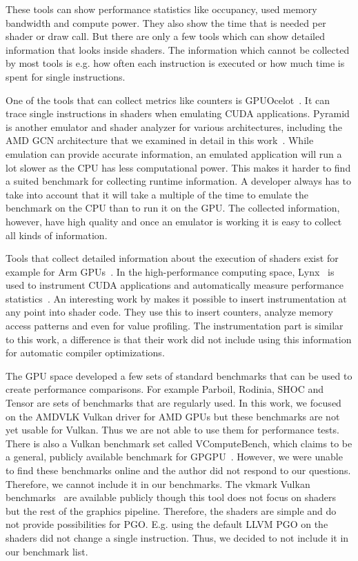 These tools can show performance statistics like occupancy, used memory bandwidth and compute power.
They also show the time that is needed per shader or draw call.
But there are only a few tools which can show detailed information that looks inside shaders.
The information which cannot be collected by most tools is e.g. how often each instruction is executed or how much time is spent for single instructions.

One of the tools that can collect metrics like counters is GPUOcelot~\cite{GPUOcelot, Lakshminarayana2010}.
It can trace single instructions in shaders when emulating CUDA applications.
Pyramid is another emulator and shader analyzer for various architectures, including the AMD GCN architecture that we examined in detail in this work~\cite{Pyramid}.
While emulation can provide accurate information, an emulated application will run a lot slower as the CPU has less computational power.
This makes it harder to find a suited benchmark for collecting runtime information.
A developer always has to take into account that it will take a multiple of the time to emulate the benchmark on the CPU than to run it on the GPU.
The collected information, however, have high quality and once an emulator is working it is easy to collect all kinds of information.

Tools that collect detailed information about the execution of shaders exist for example for Arm GPUs~\cite{Barton2013}.
In the high-performance computing space, Lynx~\cite{Lynx} is used to instrument CUDA applications and automatically measure performance statistics~\cite{Farooqui2014}.
An interesting work by \citet{Stephenson2015} makes it possible to insert instrumentation at any point into shader code.
They use this to insert counters, analyze memory access patterns and even for value profiling.
The instrumentation part is similar to this work, a difference is that their work did not include using this information for automatic compiler optimizations.

The GPU space developed a few sets of standard benchmarks that can be used to create performance comparisons.
For example Parboil, Rodinia, SHOC and Tensor are sets of benchmarks that are regularly used.
In this work, we focused on the AMDVLK Vulkan driver for AMD GPUs but these benchmarks are not yet usable for Vulkan.
Thus we are not able to use them for performance tests.
There is also a Vulkan benchmark set called VComputeBench, which claims to be a general, publicly available benchmark for GPGPU~\cite{Mammeri2018}.
However, we were unable to find these benchmarks online and the author did not respond to our questions.
Therefore, we cannot include it in our benchmarks.
The vkmark Vulkan benchmarks~\cite{vkmark} are available publicly though this tool does not focus on shaders but the rest of the graphics pipeline.
Therefore, the shaders are simple and do not provide possibilities for PGO.
E.g. using the default LLVM PGO on the shaders did not change a single instruction.
Thus, we decided to not include it in our benchmark list.

